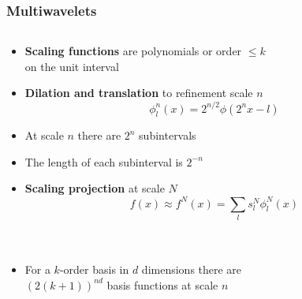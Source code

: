 
\begin{frame}
    \frametitle{Multiwavelets}
    \begin{columns}
    \begin{column}[b]{0.55\linewidth}
	\begin{itemize}
	    \item   \textbf{Scaling functions} are polynomials or order $\leq k$\\
		    on the unit interval
	    \item   \textbf{Dilation and translation} to refinement scale $n$
		    \begin{equation}
			\nonumber
			\phi_l^n(x) = 2^{n/2}\phi(2^nx-l)
		    \end{equation}
	    \item   At scale $n$ there are $2^n$ subintervals
	    \item   The length of each subinterval is $2^{-n}$
	    \item   \textbf{Scaling projection} at scale $N$
		    \begin{equation}
			\nonumber
			f(x) \approx f^N(x) = \sum_l s_l^N \phi_l^N(x)
		    \end{equation}
		    \ \\
		    \ \\
	    \item   For a $k$-order basis in $d$ dimensions there are\\
		    $\left(2(k+1)\right)^{nd}$ basis functions at scale $n$\\
	\end{itemize}
	\centering

\end{column}
\end{columns}
\end{frame}
